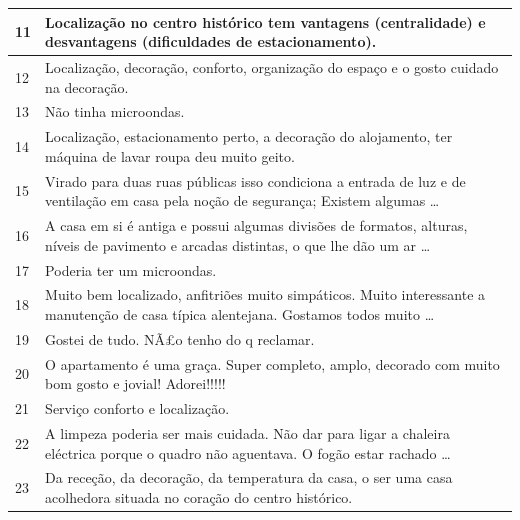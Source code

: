 \documentclass[a4paper,10pt]{article}
\begin{document}
\begin{table}[!ht]
\begin{adjustbox}{width=\columnwidth,center}
\begin{tabular}{|l|l|}
      11    & Localização no centro histórico tem vantagens (centralidade) e desvantagens (dificuldades de estacionamento).                                \\ \hline
      12    & Localização, decoração, conforto, organização do espaço e o gosto cuidado na decoração.                                                      \\ \hline
      13    & Não tinha microondas.                                                                                                                        \\ \hline
      14    & Localização, estacionamento perto, a decoração do alojamento, ter máquina de lavar roupa deu muito geito.                                    \\ \hline
      15    & Virado para duas ruas públicas isso condiciona a entrada de luz e de ventilação em casa pela noção de segurança;
      Existem algumas \ldots
      \\ \hline
      16    & A casa em si é antiga e possui algumas divisões de formatos, alturas, níveis de pavimento e arcadas distintas, o que lhe dão um ar \ldots
      \\ \hline
      17    & Poderia ter um microondas.                                                                                                                   \\ \hline
      18    & Muito bem localizado, anfitriões muito simpáticos.
      Muito interessante a manutenção de casa típica alentejana.
      Gostamos todos muito \ldots
      \\ \hline
      19    & Gostei de tudo. NÃ£o tenho do q reclamar.                                                                                                    \\ \hline
      20    & O apartamento é uma graça. Super completo, amplo, decorado com muito bom gosto e jovial! Adorei!!!!!                                         \\ \hline
      21    & Serviço conforto e localização.                                                                                                              \\ \hline
      22    & A limpeza poderia ser mais cuidada. Não dar para ligar a chaleira eléctrica porque o quadro não aguentava. O fogão estar rachado \ldots      \\ \hline
      23    & Da receção, da decoração, da temperatura da casa, o ser uma casa acolhedora situada no coração do centro histórico.                          \\ \hline

\end{tabular}
\end{adjustbox}
\end{table}
\end{document}
